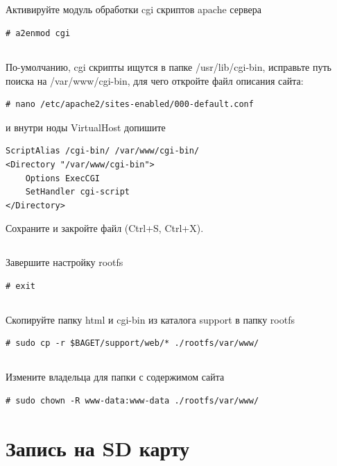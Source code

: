 \subsection{} Активируйте модуль обработки cgi скриптов apache сервера
\begin{lstlisting}[style=bash]
# a2enmod cgi
\end{lstlisting}

\subsection{} По-умолчанию, cgi скрипты ищутся в папке /usr/lib/cgi-bin,  исправьте путь поиска на /var/www/cgi-bin, для чего откройте файл описания сайта:
\begin{lstlisting}[style=bash]
# nano /etc/apache2/sites-enabled/000-default.conf
\end{lstlisting}
и внутри ноды VirtualHost допишите
\begin{lstlisting}[style=stdout]
ScriptAlias /cgi-bin/ /var/www/cgi-bin/
<Directory "/var/www/cgi-bin">
	Options ExecCGI
	SetHandler cgi-script
</Directory>
\end{lstlisting}
Сохраните и закройте файл (Ctrl+S, Ctrl+X).

\subsection{} Завершите настройку rootfs
\begin{lstlisting}[style=bash]
# exit
\end{lstlisting}

\subsection{} Скопируйте папку html и cgi-bin из каталога support в папку rootfs
\begin{lstlisting}[style=bash]
# sudo cp -r $BAGET/support/web/* ./rootfs/var/www/
\end{lstlisting}

\subsection{} Измените владельца для папки с содержимом сайта
\begin{lstlisting}[style=bash]
# sudo chown -R www-data:www-data ./rootfs/var/www/
\end{lstlisting}

\section{Запись на SD карту}

